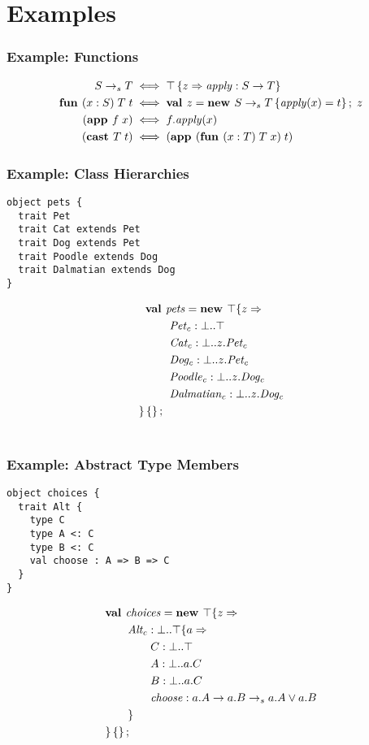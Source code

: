 \documentclass{beamer}
\begin{document}
\section{Examples}

\begin{frame}[fragile]
\frametitle{Example: Functions}
\begin{align*}
S\rightarrow_sT &\iff {\top\left\{z \Rightarrow \mathit{apply} : S \rightarrow T \right\}}\\
\textbf{fun } (x:S)\;T\;t &\iff \textbf{val }z = \textbf{new }{S\rightarrow_sT}\left\{\mathit{apply}(x) = t\right\} ;\; z\\
(\textbf{app }f\;x) &\iff f.\mathit{apply}(x)\\
(\textbf{cast }T\;t)&\iff (\textbf{app }(\textbf{fun } (x:T)\;T\;x)\;t)
\end{align*}
\end{frame}


\begin{frame}[fragile]
\frametitle{Example: Class Hierarchies}
\begin{verbatim}
object pets {
  trait Pet
  trait Cat extends Pet
  trait Dog extends Pet
  trait Poodle extends Dog
  trait Dalmatian extends Dog
}
\end{verbatim}
\begin{align*}
\textbf{val }&\mathit{pets} = \textbf{new }\top \{z \Rightarrow \\
&\ \mathit{Pet_c} : \bot..\top\\
&\ \mathit{Cat_c} : \bot..z.{\mathit{Pet_c}}\\
&\ \mathit{Dog_c} : \bot..z.{\mathit{Pet_c}}\\
&\ \mathit{Poodle_c} : \bot..z.{\mathit{Dog_c}}\\
&\ \mathit{Dalmatian_c} : \bot..z.{\mathit{Dog_c}}\\
 \} \left\{\right\} ;\;\\&
\end{align*}
\end{frame}

\begin{frame}[fragile]
\frametitle{Example: Abstract Type Members}
\begin{verbatim}
object choices {
  trait Alt {
    type C
    type A <: C
    type B <: C
    val choose : A => B => C
  }
}
\end{verbatim}
\begin{align*}
&\textbf{val }\mathit{choices} = \textbf{new }\top \{z \Rightarrow \\
&\quad\quad\mathit{Alt_c} : \bot..\top \{a \Rightarrow \\
&\quad\quad\quad\quad C : \bot..\top\\
&\quad\quad\quad\quad A : \bot..a.C\\
&\quad\quad\quad\quad B : \bot..a.C\\
&\quad\quad\quad\quad\mathit{choose} : a.A \rightarrow a.B\rightarrow_sa.A \vee a.B\\
&\quad\quad \}\\
& \}\left\{\right\} ;\;
\end{align*}
\end{frame}
\end{document}
